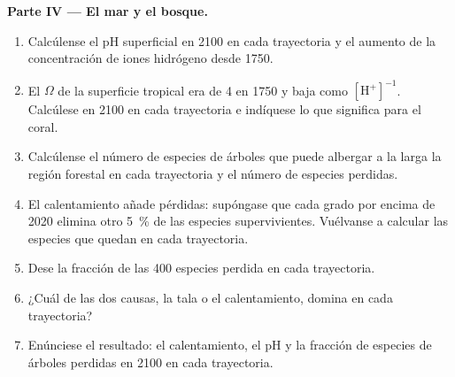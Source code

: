\begin{problem}
\medskip
\noindent\textbf{Parte IV --- El mar y el bosque.}
\begin{enumerate}[resume]
  \item Calcúlense el pH superficial en 2100 en cada trayectoria y el
        aumento de la concentración de iones hidrógeno desde 1750.
  \item El  $\Omega$ de la superficie tropical era de
        4 en 1750 y baja como $[\ensuremath{\mathrm{H^{+}}}]^{-1}$. Calcúlese en 2100
        en cada trayectoria e indíquese lo que significa para el coral.
  \item Calcúlense el número de especies de árboles que puede albergar a la
        larga la región forestal en cada trayectoria y el número de
        especies perdidas.
  \item El calentamiento añade pérdidas: supóngase que cada grado por
        encima de 2020 elimina otro \qty{5}{\%} de las especies
        supervivientes. Vuélvanse a calcular las especies que quedan en
        cada trayectoria.
  \item Dese la fracción de las 400 especies perdida en cada trayectoria.
  \item ¿Cuál de las dos causas, la tala o el calentamiento, domina en cada
        trayectoria?
  \item Enúnciese el resultado: el calentamiento, el pH y la fracción de
        especies de árboles perdidas en 2100 en cada trayectoria.
\end{enumerate}
\end{problem}
